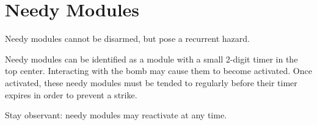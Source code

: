 \documentclass{../../ktane-mod}
\begin{document}
  \section*{Needy Modules}

  \vspace{0.4cm}

  Needy modules cannot be disarmed, but pose a recurrent hazard.

  Needy modules can be identified as a module with a small 2-digit timer in the top center.
  Interacting with the bomb may cause them to become activated.
  Once activated, these needy modules must be tended to regularly before their timer expires in order to prevent a strike.

  Stay observant: needy modules may reactivate at any time.

  \vspace{2cm}

  

  

  \clearpage
  

\cleardoublepage
\end{document}
